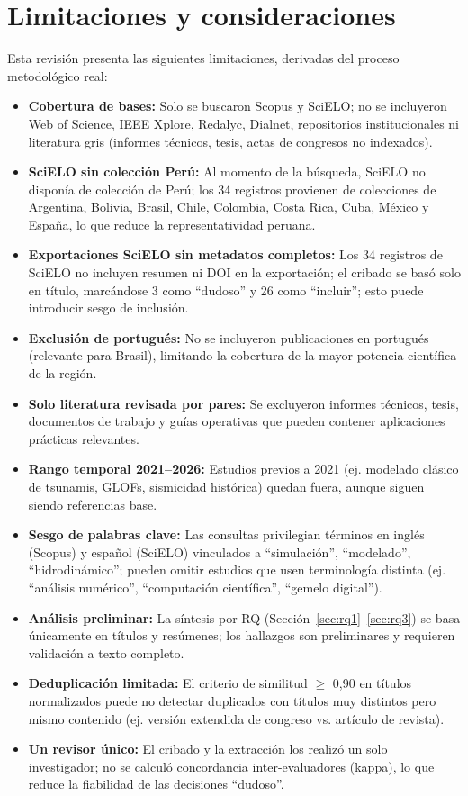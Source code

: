 \documentclass[12pt,a4paper]{article}
\begin{document}
\section{Limitaciones y consideraciones}
Esta revisión presenta las siguientes limitaciones, derivadas del proceso metodológico real:
\begin{itemize}
  \item \textbf{Cobertura de bases:} Solo se buscaron Scopus y SciELO; no se incluyeron Web of Science, IEEE Xplore, Redalyc, Dialnet, repositorios institucionales ni literatura gris (informes técnicos, tesis, actas de congresos no indexados).
  \item \textbf{SciELO sin colección Perú:} Al momento de la búsqueda, SciELO no disponía de colección de Perú; los 34 registros provienen de colecciones de Argentina, Bolivia, Brasil, Chile, Colombia, Costa Rica, Cuba, México y España, lo que reduce la representatividad peruana.
  \item \textbf{Exportaciones SciELO sin metadatos completos:} Los 34 registros de SciELO no incluyen resumen ni DOI en la exportación; el cribado se basó solo en título, marcándose 3 como ``dudoso'' y 26 como ``incluir''; esto puede introducir sesgo de inclusión.
  \item \textbf{Exclusión de portugués:} No se incluyeron publicaciones en portugués (relevante para Brasil), limitando la cobertura de la mayor potencia científica de la región.
  \item \textbf{Solo literatura revisada por pares:} Se excluyeron informes técnicos, tesis, documentos de trabajo y guías operativas que pueden contener aplicaciones prácticas relevantes.
  \item \textbf{Rango temporal 2021--2026:} Estudios previos a 2021 (ej. modelado clásico de tsunamis, GLOFs, sismicidad histórica) quedan fuera, aunque siguen siendo referencias base.
  \item \textbf{Sesgo de palabras clave:} Las consultas privilegian términos en inglés (Scopus) y español (SciELO) vinculados a ``simulación'', ``modelado'', ``hidrodinámico''; pueden omitir estudios que usen terminología distinta (ej. ``análisis numérico'', ``computación científica'', ``gemelo digital'').
  \item \textbf{Análisis preliminar:} La síntesis por RQ (Sección~\ref{sec:rq1}--\ref{sec:rq3}) se basa únicamente en títulos y resúmenes; los hallazgos son preliminares y requieren validación a texto completo.
  \item \textbf{Deduplicación limitada:} El criterio de similitud $\ge$ 0,90 en títulos normalizados puede no detectar duplicados con títulos muy distintos pero mismo contenido (ej. versión extendida de congreso vs. artículo de revista).
  \item \textbf{Un revisor único:} El cribado y la extracción los realizó un solo investigador; no se calculó concordancia inter-evaluadores (kappa), lo que reduce la fiabilidad de las decisiones ``dudoso''.
\end{itemize}
\end{document}
